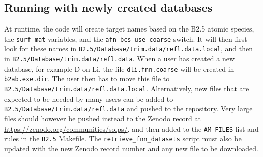 \subsection{Running with newly created databases}

At runtime, the code will create target names based on the B2.5 atomic species, the {\tt surf\_mat} variables, and the {\tt afn\_bcs\_use\_coarse} switch. It will then first look for these names in {\tt B2.5/Database/trim.data/refl.data.local}, and then in {\tt B2.5/Database/trim.data/refl.data}. When a user has created a new database, for example D on Li, the file {\tt dli.fnn.coarse} will be created in {\tt b2ab.exe.dir}. The user then has to move this file to {\tt B2.5/Database/trim.data/refl.data.local}. Alternatively, new files that are expected to be needed by many users can be added to {\tt B2.5/Database/trim.data/refl.data} and pushed to the repository. Very large files should however be pushed instead to the Zenodo record at \href{https://zenodo.org/communities/solps/}{https://zenodo.org/communities/solps/}, and then added to the {\tt AM\_FILES} list and rules in the {\tt B2.5} Makefile. The {\tt retrieve\_fnn\_datasets} script must also be updated with the new Zenodo record number and any new file to be downloaded.

